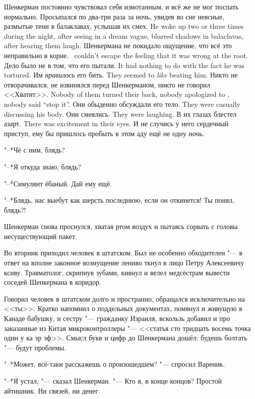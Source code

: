 Шенкерман постоянно чувствовал себя измотанным, и всё же не мог поспать нормально.
{Просыпался по два-три раза за ночь, увидев во сне неясные, размытые тени в балаклавах, услышав их смех.}
{He woke up two or three times during the night, after seeing in a dream vague, blurred shadows in balaclavas, after hearing them laugh.}
{Шенкермана не покидало ощущение, что всё это неправильно в корне.}
{\Shenkerman\ couldn't escape the feeling that it was wrong at the root.}
{Дело было не в том, что его пытали.}
{It had nothing to do with the fact he was tortured.}
{Им \emph{нравилось} его бить.}
{They seemed to \emph{like} beating him.}
{Никто не отворачивался, не извинялся перед Шенкерманом, никто не говорил <<Хватит>>.}
{Nobody of them turned their back, nobody apologized to \Shenkerman, nobody said ``stop it''.}
{Они обыденно обсуждали его тело.}
{They were casually discussing his body.}
{Они смеялись.}
{They were laughing.}
{В их глазах блестел азарт.}
{There was excitement in their eyes.}
И не случись у него сердечный приступ, ему бы пришлось пробыть в этом аду ещё не одну ночь.

"--*Чё с ним, блядь?

"--*Я откуда знаю, блядь?

"--*Симулянт ёбаный.
Дай ему ещё.

"--*Блядь, нас выебут как шерсть последнюю, если он откинется!
Ты понял, блядь?!

Шенкерман снова проснулся, хватая ртом воздух и пытаясь сорвать с головы несуществующий пакет.

\label{Tue_2012_09_04}

Во вторник приходил человек в штатском.
Был не особенно обходителен "--- в ответ на вполне законное возмущение лениво ткнул в лицо Петру Алексеевичу ксиву.
Травматолог, скрипнув зубами, кивнул и велел медсёстрам вывести соседей Шенкермана в коридор.

Говорил человек в штатском долго и пространно, обращался исключительно на <<ты>>.
Кратко напомнил о поддельных документах, помянул и живущую в Канаде бабушку, и сестру "--- гражданку Израиля, вскользь добавил и про заказанные из Китая микроконтроллеры "--- <<статья сто тридцать восемь точка один у ка эр эф>>.
Смысл букв и цифр до Шенкермана дошёл: будешь болтать "--- будут проблемы.

"--*Может, всё-таки расскажешь о произошедшем? "--- спросил Вареник.

"--*Я устал, "--- сказал Шенкерман.
"--- Кто я, в конце концов?
Простой айтишник.
Ни связей, ни денег.

